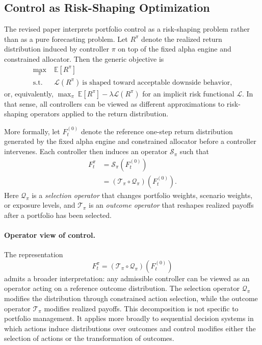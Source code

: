 \documentclass[10pt,twocolumn]{article}
\begin{document}
\subsection{Control as Risk-Shaping Optimization}

The revised paper interprets portfolio control as a risk-shaping problem rather
than as a pure forecasting problem. Let $R^\pi$ denote the realized return
distribution induced by controller $\pi$ on top of the fixed alpha engine and
constrained allocator. Then the generic objective is
\[
\begin{aligned}
\max_{\pi}\;& \mathbb{E}[R^\pi] \\
\text{s.t.}\;& \mathcal{L}(R^\pi)\ \text{is shaped toward acceptable downside behavior,}
\end{aligned}
\]
or, equivalently, $\max_{\pi}\ \mathbb{E}[R^\pi]-\lambda\mathcal{L}(R^\pi)$ for
an implicit risk functional $\mathcal{L}$. In that sense, all controllers can
be viewed as different approximations to risk-shaping operators applied to the
return distribution.

More formally, let $F_t^{(0)}$ denote the reference one-step return
distribution generated by the fixed alpha engine and constrained allocator
before a controller intervenes. Each controller then induces an operator
$\mathcal{S}_\pi$ such that
\[
\begin{aligned}
F_t^\pi
&= \mathcal{S}_\pi\!\left(F_t^{(0)}\right) \\
&= \left(\mathcal{T}_\pi \circ \mathcal{Q}_\pi\right)\!\left(F_t^{(0)}\right).
\end{aligned}
\]
Here $\mathcal{Q}_\pi$ is a \emph{selection operator} that changes portfolio
weights, scenario weights, or exposure levels, and $\mathcal{T}_\pi$ is an
\emph{outcome operator} that reshapes realized payoffs after a portfolio has
been selected.

\paragraph{Operator view of control.}
The representation
\[
F_t^\pi = (\mathcal{T}_\pi \circ \mathcal{Q}_\pi)(F_t^{(0)})
\]
admits a broader interpretation: any admissible controller can be viewed as an
operator acting on a reference outcome distribution. The selection operator
$\mathcal{Q}_\pi$ modifies the distribution through constrained action
selection, while the outcome operator $\mathcal{T}_\pi$ modifies realized
payoffs. This decomposition is not specific to portfolio management. It applies
more broadly to sequential decision systems in which actions induce
distributions over outcomes and control modifies either the selection of
actions or the transformation of outcomes.
\end{document}
